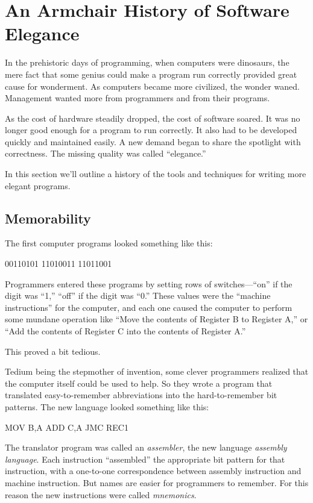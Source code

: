 \section{An Armchair History of Software Elegance}

In the prehistoric days of programming, when computers were dinosaurs,
the mere fact that some genius could make a program run correctly
provided great cause for wonderment. As computers became more
civilized, the wonder waned. Management wanted more from programmers
and from their programs.

As the cost of hardware steadily dropped, the cost of software soared.
It was no longer good enough for a program to run correctly. It also
had to be developed quickly and maintained easily. A new demand began
to share the spotlight with correctness.  The missing quality was
called ``elegance.''

In this section we'll outline a history of the tools and techniques
for writing more elegant programs.

\subsection{Memorability}
The first computer programs looked something like this:%
\begin{Code}
00110101
11010011
11011001
\end{Code}
Programmers entered these programs by setting rows of
switches---``on'' if the digit was ``1,'' ``off'' if the digit was ``0.''
These values were the ``machine instructions'' for the computer, and
each one caused the computer to perform some mundane operation like
``Move the contents of Register B to Register A,'' or ``Add the
contents of Register C into the contents of Register A.''

This proved a bit tedious.

Tedium being the stepmother of invention, some clever programmers
realized that the computer itself could be used to help.  So they
wrote a program that translated easy-to-remember
abbreviations into the hard-to-remember bit
patterns. The new language looked something like this:
\begin{Code}
MOV B,A
ADD C,A
JMC REC1
\end{Code}
The translator program was called an
\emph{assembler},
the new language
\emph{assembly language}.
Each instruction ``assembled'' the appropriate bit pattern for that
instruction, with a one-to-one correspondence between assembly
instruction and machine instruction.  But names are easier for
programmers to remember. For this reason the new instructions were called
\emph{mnemonics}.%


